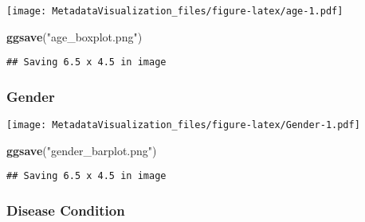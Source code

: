 \documentclass[]{article}
\newenvironment{Shaded}{\begin{snugshade}}{\end{snugshade}}
\newcommand{\DataTypeTok}[1]{\textcolor[rgb]{0.13,0.29,0.53}{#1}}
\newcommand{\KeywordTok}[1]{\textcolor[rgb]{0.13,0.29,0.53}{\textbf{#1}}}
\newcommand{\NormalTok}[1]{#1}
\newcommand{\OperatorTok}[1]{\textcolor[rgb]{0.81,0.36,0.00}{\textbf{#1}}}
\newcommand{\StringTok}[1]{\textcolor[rgb]{0.31,0.60,0.02}{#1}}
\begin{document}
\texttt{[image: MetadataVisualization\_files/figure-latex/age-1.pdf]}

\begin{Shaded}
\begin{Highlighting}[]
\KeywordTok{ggsave}\NormalTok{(}\StringTok{"age_boxplot.png"}\NormalTok{)}
\end{Highlighting}
\end{Shaded}

\begin{verbatim}
## Saving 6.5 x 4.5 in image
\end{verbatim}

\hypertarget{gender}{%
\subsubsection{Gender}\label{gender}}

\begin{Shaded}
\end{Shaded}

\texttt{[image: MetadataVisualization\_files/figure-latex/Gender-1.pdf]}

\begin{Shaded}
\begin{Highlighting}[]
\KeywordTok{ggsave}\NormalTok{(}\StringTok{"gender_barplot.png"}\NormalTok{)}
\end{Highlighting}
\end{Shaded}

\begin{verbatim}
## Saving 6.5 x 4.5 in image
\end{verbatim}

\hypertarget{disease-condition}{%
\subsubsection{Disease Condition}\label{disease-condition}}
\end{document}
